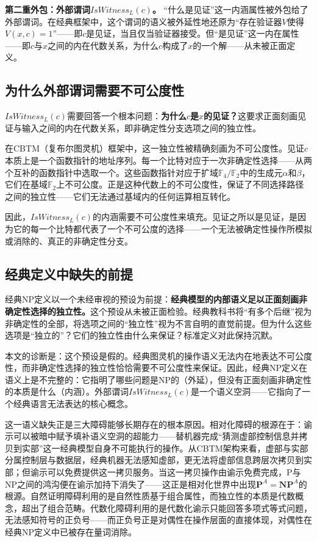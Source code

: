 \documentclass{ctexart}
\begin{document}
	\textbf{第二重外包：外部谓词$IsWitness_L(c)$。} ``什么是见证''这一内涵属性被外包给了外部谓词。在经典框架中，这个谓词的语义被外延性地还原为``存在验证器$V$使得$V(x,c)=1$''——即$c$是见证，当且仅当验证器接受。但``是见证''这一内在属性——即$c$与$x$之间的内在代数关系，为什么$c$构成了$x$的一个解——从未被正面定义。
	
	\subsection{为什么外部谓词需要不可公度性}
	
	$IsWitness_L(c)$需要回答一个根本问题：\textbf{为什么$c$是$x$的见证？}这要求正面刻画见证与输入之间的内在代数关系，即非确定性分支选项之间的独立性。
	
	在CBTM（复布尔图灵机）框架中，这一独立性被精确刻画为不可公度性。见证$c$本质上是一个函数指针的地址序列。每一个比特对应于一次非确定性选择——从两个互补的函数指针中选取一个。这些函数指针对应于扩域$\mathbb{F}_4/\mathbb{F}_2$中的生成元$\alpha$和$\beta$，它们在基域$\mathbb{F}_2$上不可公度。正是这种代数上的不可公度性，保证了不同选择路径之间的独立性——它们无法通过基域内的任何运算相互转化。
	
	因此，$IsWitness_L(c)$的内涵需要不可公度性来填充。见证之所以是见证，是因为它的每一个比特都代表了一个不可公度的选择——一个无法被确定性操作所模拟或消除的、真正的非确定性分支。
	
	\subsection{经典定义中缺失的前提}
	
	经典NP定义以一个未经审视的预设为前提：\textbf{经典模型的内部语义足以正面刻画非确定性选择的独立性。}这个预设从未被正面检验。经典教科书将``有多个后继''视为非确定性的全部，将选项之间的``独立性''视为不言自明的直觉前提。但为什么这些选项是``独立的''？它们的独立性由什么来保证？标准定义对此保持沉默。
	
	本文的诊断是：这个预设是假的。经典图灵机的操作语义无法内在地表达不可公度性，而非确定性选择的独立性恰恰需要不可公度性来保证。因此，经典NP定义在语义上是不完整的：它指明了哪些问题是NP的（外延），但没有正面刻画非确定性的本质是什么（内涵）。外部谓词$IsWitness_L(c)$是一个语义空洞——它指向了一个经典语言无法表达的核心概念。
	
	这一语义缺失正是三大障碍能够长期存在的根本原因。相对化障碍的根源在于：谕示可以被暗中赋予填补语义空洞的超能力——替机器完成“猜测虚部控制信息并拷贝到实部”这一经典模型自身不可能执行的操作。从CBTM架构来看，虚部与实部分属控制层与数据层，经典机器无法感知虚部，更无法将虚部信息跨层次拷贝到实部；但谕示可以免费提供这一拷贝服务。当这一拷贝操作由谕示免费完成，P与NP之间的鸿沟便在谕示加持下消失了——这正是相对化世界中出现$\mathbf{P}^A = \mathbf{NP}^A$的根源。自然证明障碍利用的是自然性质基于组合属性，而独立性的本质是代数概念，超出了组合范畴。代数化障碍利用的是代数化谕示只能回答多项式等式问题，无法感知符号的正负号——而正负号正是对偶性在操作层面的直接体现，对偶性在经典NP定义中已被存在量词消除。
	
\end{document}
